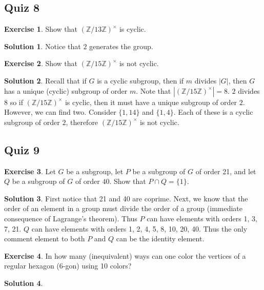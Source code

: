 \documentclass[12pt]{article}
\theoremstyle{definition}
\newcommand{\Z}{\mathbb{Z}}
\newtheorem{exercise}{\color{YellowOrange}Exercise}
\theoremstyle{definition}
\newtheorem{solution}{\color{Goldenrod}Solution}
\begin{document}
\subsection{Quiz 8}
\begin{exercise}
	Show that $(\Z/13 \Z)^{\times}$ is cyclic. 
\end{exercise}
\begin{solution}
	Notice that $2$ generates the group. 
\end{solution}

\begin{exercise}
	Show that $(\Z/15 \Z)^{\times}$ is not cyclic. 
\end{exercise}
\begin{solution}
	Recall that if $G$ is a cyclic subgroup, then if $m$ divides $|G|$, then $G$ has a unique (cyclic) subgroup of order $m$. Note that $|(\Z/15 \Z)^{\times}| = 8$. $2$ divides $8$ so if $(\Z/15 \Z)^{\times}$ is cyclic, then it must have a unique subgroup of order $2$. However, we can find two. Consider $\{1,14\}$ and $\{1,4\}$. Each of these is a cyclic subgroup of order $2$, therefore $(\Z/15 \Z)^{\times}$ is not cyclic. 
\end{solution}

\subsection{Quiz 9}
\begin{exercise}
	Let $G$ be a subgroup, let $P$ be a subgroup of $G$ of order 21, and let $Q$ be a subgroup of $G$ of order $40$. Show that $P \cap Q = \{1\}$. 
\end{exercise}
\begin{solution}
	First notice that 21 and 40 are coprime. Next, we know that the order of an element in a group must divide the order of a group (immediate consequence of Lagrange's theorem). Thus $P$ can have elements with orders 1, 3, 7, 21. $Q$ can have elements with orders 1, 2, 4, 5, 8, 10, 20, 40. Thus the only comment element to both $P$ and $Q$ can be the identity element.   
\end{solution}

\begin{exercise}
	In how many (inequivalent) ways can one color the vertices of a regular hexagon (6-gon) using 10 colors? 
\end{exercise}
\begin{solution}
	
\end{solution}
\end{document}
